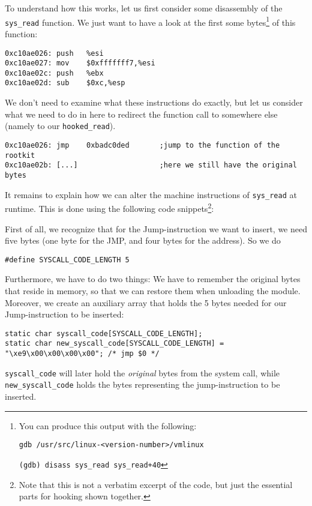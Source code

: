 \documentclass[10pt, letterpaper]{article}
\begin{document}
To understand how this works, let us first consider some disassembly of the \texttt{sys\_read} function. We just want to have a look at the first some bytes\footnote{You can produce this output with the following:

\texttt{gdb /usr/src/linux-<version-number>/vmlinux}

\texttt{(gdb) disass sys\_read\ sys\_read+40}} of this function:

\begin{verbatim}
0xc10ae026:	push   %esi
0xc10ae027:	mov    $0xfffffff7,%esi
0xc10ae02c:	push   %ebx
0xc10ae02d:	sub    $0xc,%esp
\end{verbatim}

We don't need to examine what these instructions do exactly, but let us consider what we need to do in here to redirect the function call to somewhere else (namely to our \texttt{hooked\_read}).

\begin{verbatim}
0xc10ae026:	jmp    0xbadc0ded       ;jump to the function of the rootkit
0xc10ae02b:	[...]                   ;here we still have the original bytes
\end{verbatim}

It remains to explain how we can alter the machine instructions of \texttt{sys\_read} at runtime. This is done using the following code snippets\footnote{Note that this is not a verbatim excerpt of the code, but just the essential parts for hooking shown together.}:

First of all, we recognize that for the Jump-instruction we want to insert, we need five bytes (one byte for the JMP, and four bytes for the address). So we do

\begin{verbatim}
#define SYSCALL_CODE_LENGTH 5
\end{verbatim}

Furthermore, we have to do two things: We have to remember the original bytes that reside in memory, so that we can restore them when unloading the module. Moreover, we create an auxiliary array that holds the 5 bytes needed for our Jump-instruction to be inserted:

\begin{verbatim}
static char syscall_code[SYSCALL_CODE_LENGTH];
static char new_syscall_code[SYSCALL_CODE_LENGTH] = "\xe9\x00\x00\x00\x00"; /* jmp $0 */
\end{verbatim}


\texttt{syscall\_code} will later hold the \emph{original} bytes from the system call, while \texttt{new\_syscall\_code} holds the bytes representing the jump-instruction to be inserted. 
\end{document}
